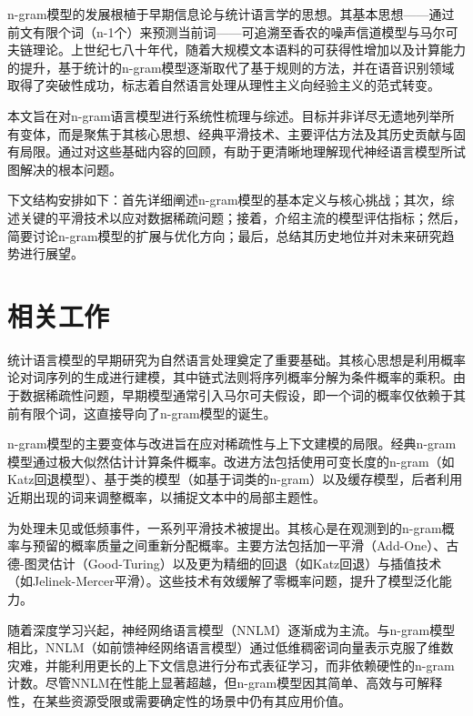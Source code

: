 \documentclass[10pt,a4paper,twocolumn]{article}
\begin{document}
n-gram模型的发展根植于早期信息论与统计语言学的思想。其基本思想——通过前文有限个词（n-1个）来预测当前词——可追溯至香农的噪声信道模型与马尔可夫链理论\cite{anonndshannon_info}。上世纪七八十年代，随着大规模文本语料的可获得性增加以及计算能力的提升，基于统计的n-gram模型逐渐取代了基于规则的方法，并在语音识别领域取得了突破性成功\cite{xiao2023relational-branchformer}，标志着自然语言处理从理性主义向经验主义的范式转变。

本文旨在对n-gram语言模型进行系统性梳理与综述。目标并非详尽无遗地列举所有变体，而是聚焦于其核心思想、经典平滑技术、主要评估方法及其历史贡献与固有局限。通过对这些基础内容的回顾，有助于更清晰地理解现代神经语言模型所试图解决的根本问题。

下文结构安排如下：首先详细阐述n-gram模型的基本定义与核心挑战；其次，综述关键的平滑技术以应对数据稀疏问题；接着，介绍主流的模型评估指标；然后，简要讨论n-gram模型的扩展与优化方向；最后，总结其历史地位并对未来研究趋势进行展望。


\section{ 相关工作 }
统计语言模型的早期研究为自然语言处理奠定了重要基础。其核心思想是利用概率论对词序列的生成进行建模，其中链式法则将序列概率分解为条件概率的乘积。由于数据稀疏性问题，早期模型通常引入马尔可夫假设，即一个词的概率仅依赖于其前有限个词，这直接导向了n-gram模型的诞生\cite{anonndshannon1948}。

n-gram模型的主要变体与改进旨在应对稀疏性与上下文建模的局限。经典n-gram模型通过极大似然估计计算条件概率。改进方法包括使用可变长度的n-gram（如Katz回退模型\cite{anonndkatz1987}）、基于类的模型（如基于词类的n-gram\cite{anonndbrown1992}）以及缓存模型\cite{anonndkuhn1990}，后者利用近期出现的词来调整概率，以捕捉文本中的局部主题性。

为处理未见或低频事件，一系列平滑技术被提出。其核心是在观测到的n-gram概率与预留的概率质量之间重新分配概率。主要方法包括加一平滑（Add-One）、古德-图灵估计（Good-Turing）以及更为精细的回退（如Katz回退\cite{anonndkatz1987}）与插值技术（如Jelinek-Mercer平滑\cite{anonndjelinek1980}）。这些技术有效缓解了零概率问题，提升了模型泛化能力。

随着深度学习兴起，神经网络语言模型（NNLM）逐渐成为主流。与n-gram模型相比，NNLM（如前馈神经网络语言模型\cite{anonndbengio2003}）通过低维稠密词向量表示克服了维数灾难，并能利用更长的上下文信息进行分布式表征学习，而非依赖硬性的n-gram计数。尽管NNLM在性能上显著超越，但n-gram模型因其简单、高效与可解释性，在某些资源受限或需要确定性的场景中仍有其应用价值。
\end{document}
